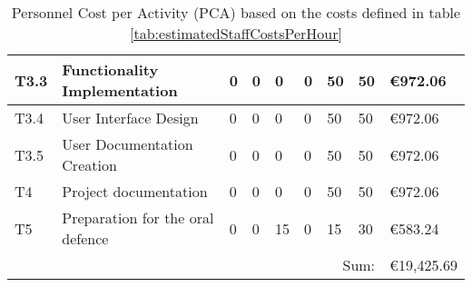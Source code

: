 \begin{landscape}
\begin{table}[!ht]
\begin{tabular}{|l|l|p{1.5cm}|p{1.5cm}|l|l|p{2cm}|l|l|}
        T3.3 & Functionality Implementation & 0 & 0 & 0 & 0 & 50 & 50 & €972.06 \\ \hline
        T3.4 & User Interface Design & 0 & 0 & 0 & 0 & 50 & 50 & €972.06 \\ \hline
        T3.5 & User Documentation Creation & 0 & 0 & 0 & 0 & 50 & 50 & €972.06 \\ \hline
        \rowcolor{black!15}
        T4 & Project documentation & 0 & 0 & 0 & 0 & 50 & 50 & €972.06 \\ \hline
        \rowcolor{black!15}
        T5 & Preparation for the oral defence & 0 & 0 & 15 & 0 & 15 & 30 & €583.24 \\ \hline
        \multicolumn{8}{r|}{Sum: } & €19,425.69 \\ \cline{9-9}
    \end{tabular}
    \caption{Personnel Cost per Activity (PCA) based on the costs defined in table \ref{tab:estimatedStaffCostsPerHour}}
    \label{tab:PCA}
\end{table}
\end{landscape}

\newpage

